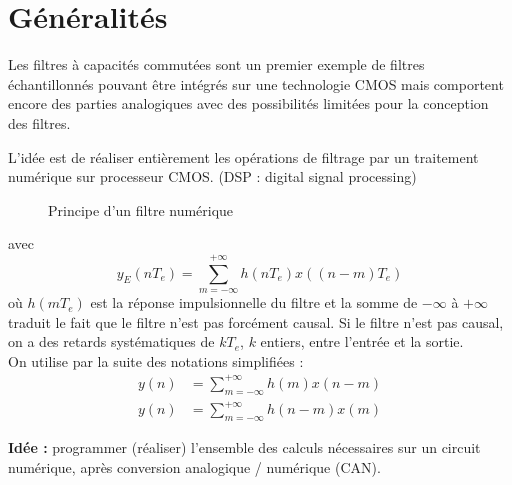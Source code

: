 \documentclass[main.tex]{subfiles}
\begin{document}
\section{Généralités}

Les filtres à capacités commutées sont un premier exemple de filtres échantillonnés pouvant être intégrés sur une technologie CMOS mais comportent encore des parties analogiques avec des possibilités limitées pour la conception des filtres.

L'idée est de réaliser entièrement les opérations de filtrage par un traitement numérique sur processeur CMOS. (DSP : digital signal processing)

\begin{figure}[H]
  \centering
  \caption{Principe d'un filtre numérique}
\end{figure}

avec \[y_E(nT_e) = \sum_{m=-\infty}^{+\infty} h(nT_e) x((n-m)T_e)\]
où $h(mT_e)$ est la réponse impulsionnelle du filtre et la somme de $-\infty$ à $+\infty$ traduit le fait que le filtre n'est pas forcément causal. Si le filtre n'est pas causal, on a des retards systématiques de $kT_e$, $k$ entiers, entre l'entrée et la sortie. \\

On utilise par la suite des notations simplifiées :
\begin{align*}
y(n) & = \sum_{m=-\infty}^{+\infty} h(m) x(n-m) \\
y(n) & = \sum_{m=-\infty}^{+\infty} h(n-m) x(m)
\end{align*}

\noindent \textbf{Idée :} programmer (réaliser) l'ensemble des calculs nécessaires sur un circuit numérique, après conversion analogique / numérique (CAN).\\
\end{document}
